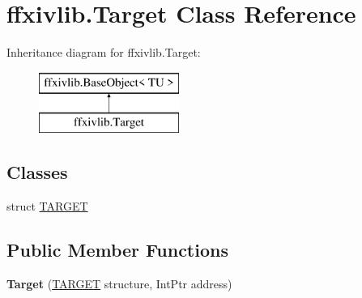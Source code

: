 \hypertarget{classffxivlib_1_1_target}{\section{ffxivlib.\-Target Class Reference}
\label{classffxivlib_1_1_target}
}
Inheritance diagram for ffxivlib.\-Target\-:\begin{figure}[H]
\begin{center}
\leavevmode
\includegraphics[height=2.000000cm]{classffxivlib_1_1_target}
\end{center}
\end{figure}
\subsection*{Classes}
\begin{DoxyCompactItemize}
\item 
struct \hyperlink{structffxivlib_1_1_target_1_1_t_a_r_g_e_t}{T\-A\-R\-G\-E\-T}
\end{DoxyCompactItemize}
\subsection*{Public Member Functions}
\begin{DoxyCompactItemize}
\item 
\hypertarget{classffxivlib_1_1_target_a5f88f56fa734de68261acd4b7ba1037b}{{\bfseries Target} (\hyperlink{structffxivlib_1_1_target_1_1_t_a_r_g_e_t}{T\-A\-R\-G\-E\-T} structure, Int\-Ptr address)}\label{classffxivlib_1_1_target_a5f88f56fa734de68261acd4b7ba1037b}

\end{DoxyCompactItemize}
